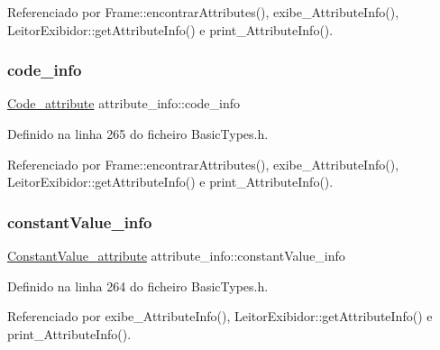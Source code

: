 Referenciado por Frame\+::encontrar\+Attributes(), exibe\+\_\+\+Attribute\+Info(), Leitor\+Exibidor\+::get\+Attribute\+Info() e print\+\_\+\+Attribute\+Info().

\mbox{\label{structattribute__info_a098a24d1810b1a2a1691cbf89199bdc5}} 
\subsubsection{\texorpdfstring{code\+\_\+info}{code\_info}}
{\footnotesize\ttfamily \hyperlink{structCode__attribute}{Code\+\_\+attribute} attribute\+\_\+info\+::code\+\_\+info}



Definido na linha 265 do ficheiro Basic\+Types.\+h.



Referenciado por Frame\+::encontrar\+Attributes(), exibe\+\_\+\+Attribute\+Info(), Leitor\+Exibidor\+::get\+Attribute\+Info() e print\+\_\+\+Attribute\+Info().

\mbox{\label{structattribute__info_ae07b4986ad567ee03d7f5b9476cd2576}} 
\subsubsection{\texorpdfstring{constant\+Value\+\_\+info}{constantValue\_info}}
{\footnotesize\ttfamily \hyperlink{structConstantValue__attribute}{Constant\+Value\+\_\+attribute} attribute\+\_\+info\+::constant\+Value\+\_\+info}



Definido na linha 264 do ficheiro Basic\+Types.\+h.



Referenciado por exibe\+\_\+\+Attribute\+Info(), Leitor\+Exibidor\+::get\+Attribute\+Info() e print\+\_\+\+Attribute\+Info().

\mbox{\label{structattribute__info_a915a26115aeeff5e3d997116f3d671ba}} 
